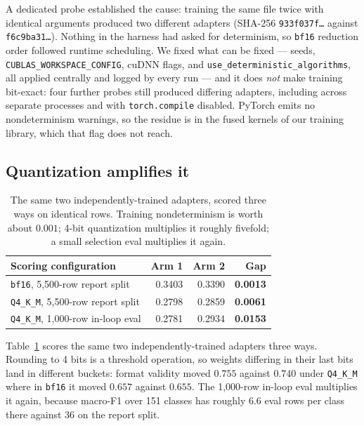 \documentclass[sigconf,10pt]{acmart}
\begin{document}
A dedicated probe established the cause: training the same file twice with identical arguments
produced two different adapters (SHA-256 \texttt{933f037f\dots} against
\texttt{f6c9ba31\dots}). Nothing in the harness had asked for determinism, so \texttt{bf16}
reduction order followed runtime scheduling. We fixed what can be fixed --- seeds,
\texttt{CUBLAS\_WORKSPACE\_CONFIG}, cuDNN flags, and
\texttt{use\_deterministic\_algorithms}, all applied centrally and logged by every run --- and
it does \emph{not} make training bit-exact: four further probes still produced differing
adapters, including across separate processes and with \texttt{torch.compile} disabled.
PyTorch emits no nondeterminism warnings, so the residue is in the fused kernels of our
training library, which that flag does not reach.

\subsection{Quantization amplifies it}

\begin{table}[t]
\centering
\small
\caption{The same two independently-trained adapters, scored three ways on identical rows.
Training nondeterminism is worth about $0.001$; 4-bit quantization multiplies it roughly
fivefold; a small selection eval multiplies it again.}
\label{tab:determinism}
\begin{tabular}{@{}lrrr@{}}
\toprule
Scoring configuration & Arm 1 & Arm 2 & Gap \\
\midrule
\texttt{bf16}, 5{,}500-row report split      & 0.3403 & 0.3390 & \textbf{0.0013} \\
\texttt{Q4\_K\_M}, 5{,}500-row report split  & 0.2798 & 0.2859 & \textbf{0.0061} \\
\texttt{Q4\_K\_M}, 1{,}000-row in-loop eval  & 0.2781 & 0.2934 & \textbf{0.0153} \\
\bottomrule
\end{tabular}
\end{table}

Table~\ref{tab:determinism} scores the same two independently-trained adapters three ways.
Rounding to 4 bits is a threshold operation, so weights differing in their last bits land in
different buckets: format validity moved $0.755$ against $0.740$ under \texttt{Q4\_K\_M} where
in \texttt{bf16} it moved $0.657$ against $0.655$. The 1{,}000-row in-loop eval multiplies it
again, because macro-F1 over 151 classes has roughly 6.6 eval rows per class there against 36
on the report split.
\end{document}
